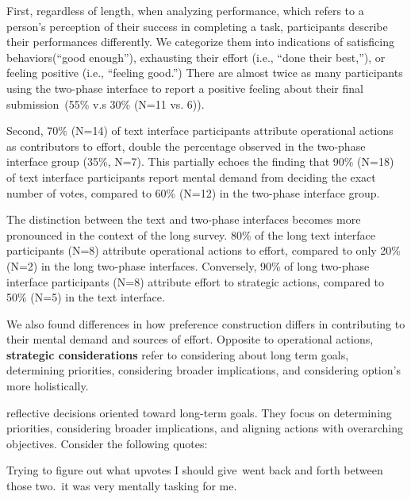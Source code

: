 First, regardless of length, when analyzing performance, which refers to a person's perception of their success in completing a task, participants describe their performances differently. We categorize them into indications of satisficing behaviors(``good enough''), exhausting their effort (i.e., ``done their best,''), or feeling positive (i.e., ``feeling good.'') There are almost twice as many participants using the two-phase interface to report a positive feeling about their final submission~(55\% v.s 30\% (N=11 vs. 6)).

Second, 70\% (N=14) of text interface participants attribute operational actions as contributors to effort, double the percentage observed in the two-phase interface group (35\%, N=7). This partially echoes the finding that 90\% (N=18) of text interface participants report mental demand from deciding the exact number of votes, compared to 60\% (N=12) in the two-phase interface group.


The distinction between the text and two-phase interfaces becomes more pronounced in the context of the long survey. 80\% of the long text interface participants (N=8) attribute operational actions to effort, compared to only 20\% (N=2) in the long two-phase interfaces. Conversely, 90\% of long two-phase interface participants (N=8) attribute effort to strategic actions, compared to 50\% (N=5) in the text interface. 

We also found differences in how preference construction differs in contributing to their mental demand and sources of effort. Opposite to operational actions, \textbf{strategic considerations} refer to considering about long term goals, determining priorities, considering broader implications, and considering option's more holistically. 

reflective decisions oriented toward long-term goals. They focus on determining priorities, considering broader implications, and aligning actions with overarching objectives. Consider the following quotes:

\begin{displayquote}
Trying to figure out what upvotes I should give~\bracketellipsis went back and forth between those two.~\bracketellipsis it was very mentally tasking for me. \hfill{}
\end{displayquote}

